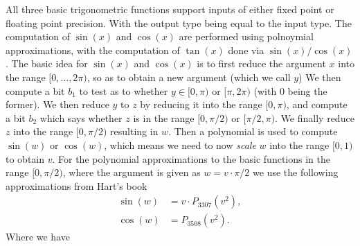 All three basic trigonometric functions support inputs of either 
fixed point or floating point precision. 
With the output type being equal to the input type.
The computation of $\sin(x)$ and $\cos(x)$ are performed
using polnoymial approximations, with the computation of $\tan(x)$ 
done via $\sin(x)/\cos(x)$.
The basic idea for $\sin(x)$ and $\cos(x)$ is to first reduce
the argument $x$ into the range $[0,\ldots,2 \pi)$, so
as to obtain a new argument (which we call $y$)
We then compute a bit $b_1$ to test as to whether
$y \in [0,\pi)$ or $[\pi,2 \pi)$ (with $0$ being
the former).
We then reduce $y$ to $z$ by reducing it into the range
$[0,\pi)$, and compute a bit $b_2$ which says whether
$z$ is in the range $[0,\pi/2)$ or $[\pi/2,\pi)$.
We finally reduce $z$ into the range $[0,\pi/2)$ resulting 
in $w$.
Then a polynomial is used to compute
$\sin(w)$ or $\cos(w)$, which means
we need to now {\em scale} $w$ into the range $[0,1)$
to obtain $v$.
For the polynomial approximations to the basic functions in
the range $[0,\pi/2)$, where the argument is given as $w = v \cdot \pi/2$
we use the following approximations from Hart's book \cite{Hart:1978:CA:540084}
\begin{align*} 
	\sin(w) &= v \cdot P_{3307}(v^2), \\
	\cos(w) &= P_{3508}(v^2).
\end{align*}
Where we have
